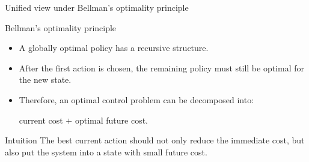 \documentclass[aspectratio=169]{beamer}
\begin{document}
\begin{frame}{Unified view under Bellman's optimality principle}
\begin{center}
{
}
\end{center}

\end{frame}


\begin{frame}{Bellman's optimality principle}

\begin{itemize}
    \item A globally optimal policy has a recursive structure.
    \vspace{0.3cm}

    \item After the first action is chosen, the remaining policy must still be optimal for the new state.
    \vspace{0.3cm}

    \item Therefore, an optimal control problem can be decomposed into:
    \vspace{0.15cm}
    \begin{center}
    \textcolor{PKUDarkPurple}{current cost}
    \quad $+$ \quad
    \textcolor{PKUDarkPurple}{optimal future cost}.
    \end{center}
\end{itemize}

\vspace{0.25cm}

\begin{block}{Intuition}
\small
The best current action should not only reduce the immediate cost, but also put the system into a state with small future cost.
\end{block}

\end{frame}
\end{document}
